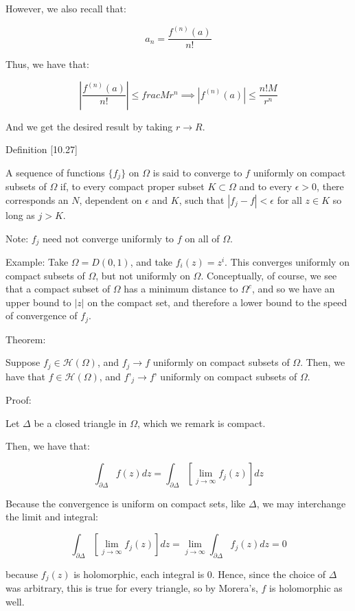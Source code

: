 \documentclass[10pt]{article}
\newcommand{\calH}{\mathcal{H}}
\begin{document}
However, we also recall that:

$$ a_n = \frac{f^{(n)}(a)}{n!}$$

Thus, we have that:

$$ \left| \frac{f^{(n)}(a)}{n!} \right| \leq frac{M}{r^n} \implies |f^{(n)}(a)| \leq \frac{n! M}{r^n} $$

And we get the desired result by taking $r \to R$.

Definition [10.27]

A sequence of functions $\{ f_j \}$ on $\Omega$ is said to converge to $f$ uniformly on compact subsets of $\Omega$ if, to every compact proper subset $K \subset \Omega$ and to every $\epsilon > 0$, there corresponds an $N$, dependent on $\epsilon$ and $K$, such that $|f_j - f| < \epsilon$ for all $ z \in K$ so long as $j > K$. 

Note: $f_j$ need not converge uniformly to $f$ on all of $\Omega$.

Example: Take $\Omega = D(0,1)$, and take $f_i(z) = z^i$. This converges uniformly on compact subsets of $\Omega$, but not uniformly on $\Omega$. Conceptually, of course, we see that a compact subset of $\Omega$ has a minimum distance to $\Omega^c$, and so we have an upper bound to $|z|$ on the compact set, and therefore a lower bound to the speed of convergence of $f_j$.

Theorem:

Suppose $f_j \in \calH(\Omega)$, and $f_j \to f$ uniformly on compact subsets of $\Omega$. Then, we have that $f \in \calH(\Omega)$, and $f’_j \to f’$ uniformly on compact subsets of $\Omega$.

Proof:

Let $\Delta$ be a closed triangle in $\Omega$, which we remark is compact.

Then, we have that:

$$\int_{\partial \Delta} f(z) dz = \int_{\partial \Delta} \left[ \lim_{j \to \infty} f_j(z) \right] dz$$

Because the convergence is uniform on compact sets, like $\Delta$, we may interchange the limit and integral:

$$\int_{\partial \Delta} \left[ \lim_{j \to \infty} f_j(z) \right] dz = \lim_{j \to \infty} \int_{\partial \Delta} f_j(z) dz  = 0 $$

because $f_j(z)$ is holomorphic, each integral is 0. Hence, since the choice of $\Delta$ was arbitrary, this is true for every triangle, so by Morera’s, $f$ is holomorphic as well.
\end{document}
